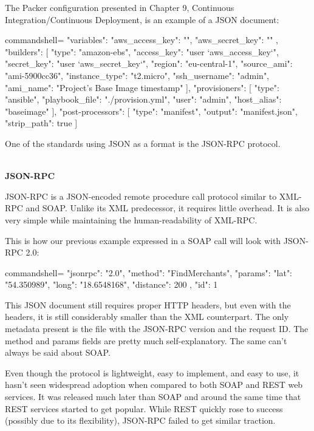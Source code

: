 The Packer configuration presented in Chapter 9, Continuous Integration/Continuous Deployment, is an example of a JSON document:

\begin{tcblisting}{commandshell={}}
{
  "variables": {
    "aws_access_key": "",
    "aws_secret_key": ""
  },
  "builders": [{
    "type": "amazon-ebs",
    "access_key": "{{user `aws_access_key`}}",
    "secret_key": "{{user `aws_secret_key`}}",
    "region": "eu-central-1",
    "source_ami": "ami-5900cc36",
    "instance_type": "t2.micro",
    "ssh_username": "admin",
    "ami_name": "Project's Base Image {{timestamp}}"
  }],
  "provisioners": [{
    "type": "ansible",
    "playbook_file": "./provision.yml",
    "user": "admin",
    "host_alias": "baseimage"
  }],
  "post-processors": [{
    "type": "manifest",
    "output": "manifest.json",
    "strip_path": true
  }]
}
\end{tcblisting}

One of the standards using JSON as a format is the JSON-RPC protocol.

\hspace*{\fill} \\ %
\noindent
\textbf{JSON-RPC}

JSON-RPC is a JSON-encoded remote procedure call protocol similar to XML-RPC and SOAP. Unlike its XML predecessor, it requires little overhead. It is also very simple while maintaining the human-readability of XML-RPC.

This is how our previous example expressed in a SOAP call will look with JSON-RPC 2.0:

\begin{tcblisting}{commandshell={}}
{
  "jsonrpc": "2.0",
  "method": "FindMerchants",
  "params": {
    "lat": "54.350989",
    "long": "18.6548168",
    "distance": 200
  },
  "id": 1
}
\end{tcblisting}

This JSON document still requires proper HTTP headers, but even with the headers, it is still considerably smaller than the XML counterpart. The only metadata present is the file with the JSON-RPC version and the request ID. The method and params fields are pretty much self-explanatory. The same can't always be said about SOAP.

Even though the protocol is lightweight, easy to implement, and easy to use, it hasn't seen widespread adoption when compared to both SOAP and REST web services. It was released much later than SOAP and around the same time that REST services started to get popular. While REST quickly rose to success (possibly due to its flexibility), JSON-RPC failed to get similar traction.

